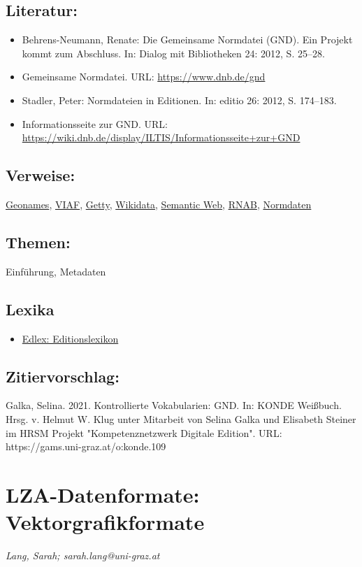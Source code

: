 \documentclass{article}
\begin{document}
        \subsection*{Literatur:}\begin{itemize}\item Behrens-Neumann, Renate: Die Gemeinsame Normdatei (GND). Ein Projekt kommt zum Abschluss. In: Dialog mit Bibliotheken 24: 2012, S. 25–28.\item Gemeinsame Normdatei. URL: \url{https://www.dnb.de/gnd}\item Stadler, Peter: Normdateien in Editionen. In: editio 26: 2012, S. 174–183.\item Informationsseite zur GND. URL: \url{https://wiki.dnb.de/display/ILTIS/Informationsseite+zur+GND}\end{itemize}\subsection*{Verweise:}\href{https://gams.uni-graz.at/o:konde.107}{Geonames}, \href{https://gams.uni-graz.at/o:konde.111}{VIAF}, \href{https://gams.uni-graz.at/o:konde.108}{Getty}, \href{https://gams.uni-graz.at/o:konde.112}{Wikidata}, \href{https://gams.uni-graz.at/o:konde.167}{Semantic Web}, \href{https://gams.uni-graz.at/o:konde.165}{RNAB}, \href{https://gams.uni-graz.at/o:konde.147}{Normdaten}\subsection*{Themen:}Einführung, Metadaten\subsection*{Lexika}\begin{itemize}\item \href{https://edlex.de/index.php?title=Gemeinsame_Normdatei_(GND)}{Edlex: Editionslexikon}\end{itemize}\subsection*{Zitiervorschlag:}Galka, Selina. 2021. Kontrollierte Vokabularien: GND. In: KONDE Weißbuch. Hrsg. v. Helmut W. Klug unter Mitarbeit von Selina Galka und Elisabeth Steiner im HRSM Projekt "Kompetenznetzwerk Digitale Edition". URL: https://gams.uni-graz.at/o:konde.109\newpage\section*{LZA-Datenformate: Vektorgrafikformate} \emph{Lang, Sarah; sarah.lang@uni-graz.at }\\
        
\end{document}
